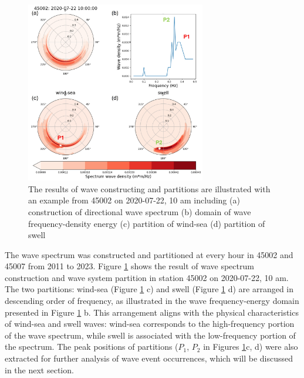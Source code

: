 \begin{figure}[htbp]
  \centering
  \includegraphics[width=0.7\textwidth]{chapter4/resources/figure4-6.jpg}
  \caption{The results of wave constructing and partitions are illustrated with
  an example from 45002 on 2020-07-22, 10 am including (a) construction of
  directional wave spectrum (b) domain of wave frequency-density energy (c)
  partition of wind-sea (d) partition of swell}
  \label{fig:fig4.6}
\end{figure}



The wave spectrum was constructed and partitioned at every hour in 45002 and
45007 from 2011 to 2023. Figure \ref{fig:fig4.6} shows the result of wave
spectrum construction and wave system partition in station 45002 on 2020-07-22,
10 am. The two partitions: wind-sea (Figure \ref{fig:fig4.6} c) and swell
(Figure \ref{fig:fig4.6} d) are arranged in descending order of frequency, as
illustrated in the wave frequency-energy domain presented in Figure
\ref{fig:fig4.6} b. This arrangement aligns with the physical characteristics of
wind-sea and swell waves: wind-sea corresponds to the high-frequency portion of
the wave spectrum, while swell is associated with the low-frequency portion of
the spectrum. The peak positions of partitions (\eg $P_1$, $P_2$ in Figures
\ref{fig:fig4.6}c, d) were also extracted for further analysis of wave event
occurrences, which will be discussed in the next section. 

